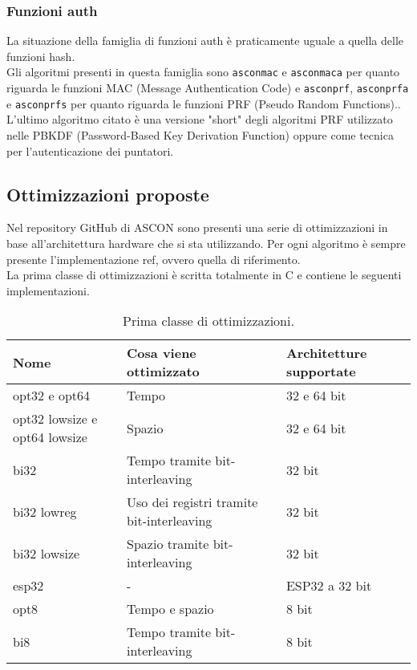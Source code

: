 \subsubsection{Funzioni auth}

La situazione della famiglia di funzioni auth è praticamente uguale a quella delle funzioni hash. \\

\noindent Gli algoritmi presenti in questa famiglia sono \texttt{asconmac} e \texttt{asconmaca} per quanto riguarda le funzioni MAC (Message Authentication Code) e \texttt{asconprf}, \texttt{asconprfa} e \texttt{asconprfs} per quanto riguarda le funzioni PRF (Pseudo Random Functions).\cite{ascon-specification-pdf}. L'ultimo algoritmo citato è una versione "short" degli algoritmi PRF utilizzato nelle PBKDF (Password-Based Key Derivation Function) oppure come tecnica per l'autenticazione dei puntatori.

\subsection{Ottimizzazioni proposte}

Nel repository GitHub di ASCON sono presenti una serie di ottimizzazioni in base all'architettura hardware che si sta utilizzando. Per ogni algoritmo è sempre presente l'implementazione ref, ovvero quella di riferimento. \\

\noindent La prima classe di ottimizzazioni è scritta totalmente in C e contiene le seguenti implementazioni\cite{github}.

\begin{table}[H]
    \centering
	\begin{tabular}{|m{}<{\centering}||m{}<{\centering}|m{}<{\centering}|}
		\hline
        \textbf{Nome} & \textbf{Cosa viene ottimizzato} & \textbf{Architetture supportate} \\
		\hline \hline
        opt32 e opt64 & Tempo & 32 e 64 bit \\
        \hline
        opt32 lowsize e opt64 lowsize & Spazio & 32 e 64 bit \\
        \hline
        bi32 & Tempo tramite bit-interleaving & 32 bit \\
        \hline
        bi32 lowreg & Uso dei registri tramite bit-interleaving & 32 bit \\
        \hline
        bi32 lowsize & Spazio tramite bit-interleaving & 32 bit \\
        \hline
        esp32 & - & ESP32 a 32 bit \\
        \hline
        opt8 & Tempo e spazio & 8 bit \\
        \hline
        bi8 & Tempo tramite bit-interleaving & 8 bit \\
        \hline
    \end{tabular}
    \caption{Prima classe di ottimizzazioni.}
\end{table}


